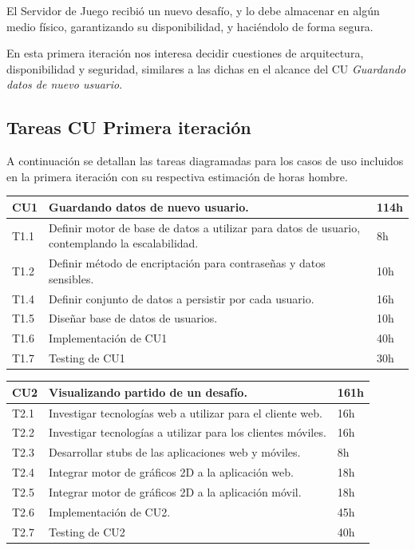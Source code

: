 \documentclass[a4paper, 10pt, twoside]{article}
\begin{document}
El Servidor de Juego recibió un nuevo desafío, y lo debe almacenar en algún medio físico, garantizando su disponibilidad, y haciéndolo de forma segura.

En esta primera iteración nos interesa decidir cuestiones de arquitectura, disponibilidad y seguridad, similares a las dichas en el alcance del CU \textit{Guardando datos de nuevo usuario}.

\subsection{Tareas CU Primera iteración}
A continuación se detallan las tareas diagramadas para los casos de uso incluidos en la primera iteración con su respectiva estimación de horas hombre.
\\

\begin{tabular}{lp{13cm}l}
  \hline
  CU1 & Guardando datos de nuevo usuario. & 114h \\
  \hline
  T1.1 & Definir motor de base de datos a utilizar para datos de usuario, contemplando la escalabilidad. & 8h \\
  T1.2 & Definir método de encriptación para contraseñas y datos sensibles. & 10h \\
  T1.4 & Definir conjunto de datos a persistir por cada usuario. & 16h \\
  T1.5 & Diseñar base de datos de usuarios. & 10h \\
  T1.6 & Implementación de CU1 & 40h\\
  T1.7 & Testing de CU1 & 30h\\
  \hline
\end{tabular}

\vspace{1em}

\begin{tabular}{lp{13cm}l}
  \hline
  CU2 & Visualizando partido de un desafío. & 161h \\
  \hline
  T2.1 & Investigar tecnologías web a utilizar para el cliente web. & 16h \\
  T2.2 & Investigar tecnologías a utilizar para los clientes móviles. & 16h \\
  T2.3 & Desarrollar stubs de las aplicaciones web y móviles. & 8h \\
  T2.4 & Integrar motor de gráficos 2D a la aplicación web. & 18h \\
  T2.5 & Integrar motor de gráficos 2D a la aplicación móvil. & 18h \\
  T2.6 & Implementación de CU2. & 45h \\
  T2.7 & Testing de CU2 & 40h\\
  \hline
\end{tabular}
\end{document}
